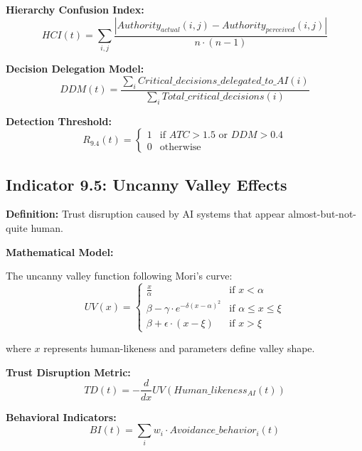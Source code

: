 \documentclass[11pt,a4paper]{article}
\begin{document}
\textbf{Hierarchy Confusion Index:}
\begin{equation}
HCI(t) = \sum_{i,j} \frac{|Authority_{actual}(i,j) - Authority_{perceived}(i,j)|}{n \cdot (n-1)}
\end{equation}

\textbf{Decision Delegation Model:}
\begin{equation}
DDM(t) = \frac{\sum_{i} Critical\_decisions\_delegated\_to\_AI(i)}{\sum_{i} Total\_critical\_decisions(i)}
\end{equation}

\textbf{Detection Threshold:}
\begin{equation}
R_{9.4}(t) = \begin{cases}
1 & \text{if } ATC > 1.5 \text{ or } DDM > 0.4 \\
0 & \text{otherwise}
\end{cases}
\end{equation}

\subsection{Indicator 9.5: Uncanny Valley Effects}

\textbf{Definition:} Trust disruption caused by AI systems that appear almost-but-not-quite human.

\textbf{Mathematical Model:}

The uncanny valley function following Mori's curve:
\begin{equation}
UV(x) = \begin{cases}
\frac{x}{\alpha} & \text{if } x < \alpha \\
\beta - \gamma \cdot e^{-\delta(x-\alpha)^2} & \text{if } \alpha \leq x \leq \xi \\
\beta + \epsilon \cdot (x - \xi) & \text{if } x > \xi
\end{cases}
\end{equation}

where $x$ represents human-likeness and parameters define valley shape.

\textbf{Trust Disruption Metric:}
\begin{equation}
TD(t) = -\frac{d}{dx}UV(Human\_likeness_{AI}(t))
\end{equation}

\textbf{Behavioral Indicators:}
\begin{equation}
BI(t) = \sum_{i} w_i \cdot Avoidance\_behavior_i(t)
\end{equation}
\end{document}
